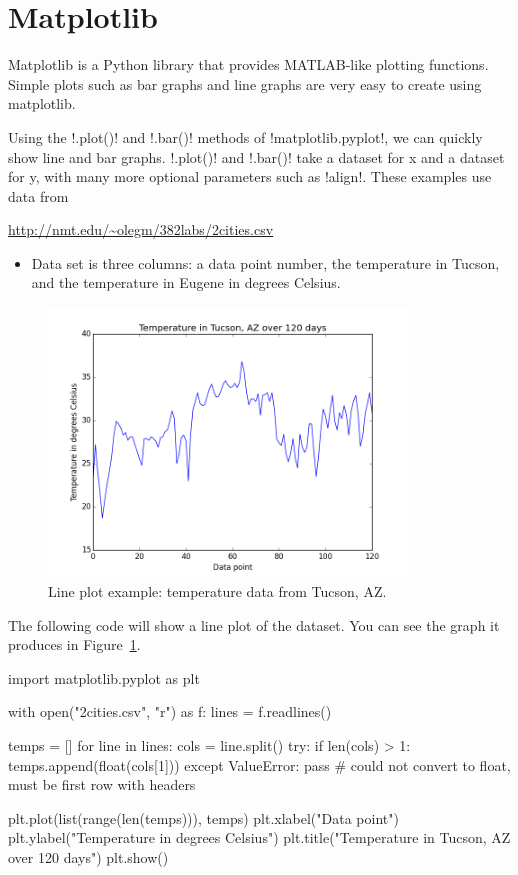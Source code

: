 \documentclass[11pt]{cselabheader}
\begin{document}
\pagebreak
\section{Matplotlib}
Matplotlib is a Python library that provides MATLAB-like plotting functions.
Simple plots such as bar graphs and line graphs are very easy to create using
matplotlib.

Using the \pythoninline!.plot()! and \pythoninline!.bar()! methods of
\pythoninline!matplotlib.pyplot!, we can quickly show line and bar graphs.
\pythoninline!.plot()! and \pythoninline!.bar()! take a dataset for x and a
dataset for y, with many more optional parameters such as \pythoninline!align!.
These examples use data from
\begin{center}
  \url{http://nmt.edu/~olegm/382labs/2cities.csv}
\end{center}

\begin{itemize}
  \item Data set is three columns: a data point number, the temperature in
    Tucson, and the temperature in Eugene in degrees Celsius.
\end{itemize}

\begin{figure}[h]
  \centering
  \includegraphics[width=0.85\textwidth]{img/line1.png}
  \caption{Line plot example: temperature data from Tucson, AZ.}
  \label{fig:line1}
\end{figure}

The following code will show a line plot of the dataset. You can see the graph
it produces in Figure~\ref{fig:line1}.

\begin{python3code}
import matplotlib.pyplot as plt

with open("2cities.csv", "r") as f:
    lines = f.readlines()

temps = []
for line in lines:
    cols = line.split()
    try:
        if len(cols) > 1:
            temps.append(float(cols[1]))
    except ValueError:
        pass # could not convert to float, must be first row with headers

plt.plot(list(range(len(temps))), temps)
plt.xlabel("Data point")
plt.ylabel("Temperature in degrees Celsius")
plt.title("Temperature in Tucson, AZ over 120 days")
plt.show()
\end{python3code}
\end{document}

